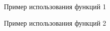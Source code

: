 \documentclass[otchet]{SCWorks}
\begin{document}
\begin{figure}[H]
	\caption{Пример использования функций 1}
	\label{pic1_2}
\end{figure}

\begin{figure}[H]
	\caption{Пример использования функций 2}
	\label{pic1_3}
\end{figure}
\end{document}
